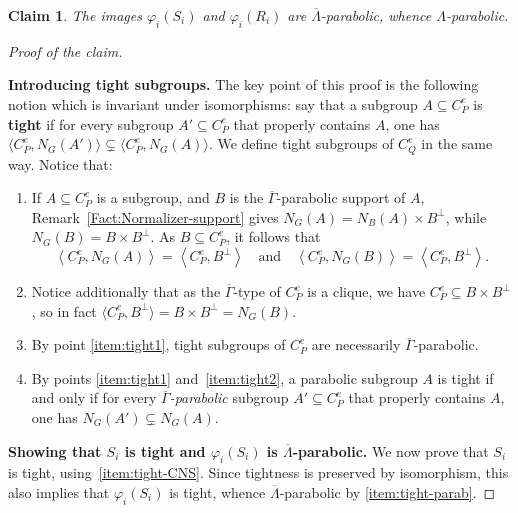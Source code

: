 \documentclass[10pt,a4paper]{amsart}
\newtheorem{claim}{Claim}
\newcommand{\deffont}[1]{\textbf{#1}}
\begin{document}
\begin{claim}\label{claim:step-1}
The images $\varphi_i(S_i)$ and $\varphi_i(R_i)$ are $\overline{\Lambda}$-parabolic, whence $\Lambda$-parabolic.
\end{claim}

\begin{proof}[Proof of the claim]~

\textbf{Introducing tight subgroups.} The key point of this proof is the following notion which is invariant under isomorphisms: say that a subgroup $A\subseteq C_P^e$ is \deffont{tight} if for every subgroup $A'\subseteq C_P^e$ that properly contains $A$, one has $\langle C_P^e,N_G(A')\rangle\subsetneq \langle C_P^e,N_G(A)\rangle$. We define tight subgroups of $C_Q^e$ in the same way. Notice that:
\begin{enumerate}[label={(\alph*)}]
\item \label{item:tight1} If $A\subseteq C_P^e$ is a subgroup, and $B$ is the $\overline{\Gamma}$-parabolic support of $A$, Remark~\ref{Fact:Normalizer-support} gives $N_G(A)=N_B(A)\times B^\perp$, while $N_G(B)=B\times B^\perp$. As $B\subseteq C_P^e$, it follows that \begin{equation*}
    \left\langle C^e_P,N_G(A)\right\rangle
    =\left\langle C_P^e, B^\perp\right\rangle 
    \quad \text{and} \quad
    \left\langle C^e_P,N_G(B)\right\rangle
    =\left\langle C_P^e, B^\perp\right\rangle.
\end{equation*}
\item \label{item:tight2} Notice additionally that as the $\overline{\Gamma}$-type of $C_P^e$ is a clique, we have $C_P^e\subseteq B\times B^\perp$, so in fact $\langle C_P^e, B^\perp\rangle=B\times B^\perp=N_G(B)$.
\item \label{item:tight-parab} By point \ref{item:tight1}, tight subgroups of $C^e_P$ are necessarily $\overline{\Gamma}$-parabolic.
\item \label{item:tight-CNS} By points \ref{item:tight1} and~\ref{item:tight2}, a parabolic subgroup $A$ is tight if and only if for every \emph{$\mathit{\overline{\Gamma}}$-parabolic} subgroup $A'\subseteq C^e_P$ that properly contains $A$, one has $N_G(A')\subsetneq N_G(A)$.
\end{enumerate} 
\medskip

\textbf{Showing that {$S_i$ is tight and} $\varphi_i(S_i)$ is $\overline{\Lambda}$-parabolic.} We now prove that $S_i$ is tight, using~\ref{item:tight-CNS}. Since tightness is preserved by isomorphism, this also implies that $\varphi_i(S_i)$ is tight, whence $\overline{\Lambda}$-parabolic by \ref{item:tight-parab}.


\end{proof}
\end{document}
